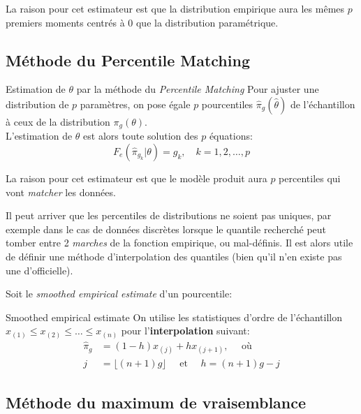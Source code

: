 \documentclass[10pt, french]{article}
\begin{document}
\begin{multicols*}{2}
La raison pour cet estimateur est que la distribution empirique aura les mêmes $p$ premiers moments centrés à 0 que la distribution paramétrique.

\subsection{Méthode du \guillemotleft Percentile Matching \guillemotright}

\begin{algo}{Estimation de $\theta$ par la méthode du \og \textit{Percentile Matching} \fg{}}
Pour ajuster une distribution de $p$ paramètres, on pose égale $p$ pourcentiles $\hat{\pi}_{g}(\hat{\theta})$ de l'échantillon à ceux de la distribution $\pi_{g}(\theta)$.\\
L'estimation de $\theta$ est alors toute solution des $p$ équations:
\begin{equation*}
	F_{e}(\hat\pi_{g_{k}} | \theta)	=	g_{k}, \quad	k = 1, 2, \dots, p
\end{equation*}
\end{algo}

La raison pour cet estimateur est que le modèle produit aura $p$ percentiles qui vont \og \textit{matcher} \fg{} les données.

Il peut arriver que les percentiles de distributions ne soient pas uniques, par exemple dans le cas de données discrètes lorsque le quantile recherché peut tomber entre 2 \emph{marches} de la fonction empirique, ou mal-définis.
Il est alors utile de définir une méthode d'interpolation des quantiles (bien qu'il n'en existe pas une d'officielle).

Soit le \og \textit{smoothed empirical estimate} \fg{} d'un pourcentile:

\begin{algo}{Smoothed empirical estimate}
On utilise les statistiques d'ordre de l'échantillon $x_{(1)} \le x_{(2)} \le \dots \le x_{(n)}$ pour l'\textbf{interpolation} suivant:
\begin{align*}
	\hat\pi_{g}
	&=	(1 - h)x_{(j)} + h x_{(j + 1)}, \quad \text{ où }	\\
	j
	&=	\lfloor (n + 1) g \rfloor	\quad
	\text{ et }	\quad
	h
	=	(n + 1) g - j
\end{align*}
\end{algo}


\columnbreak
\subsection{Méthode du maximum de vraisemblance}


\end{multicols*}
\end{document}
